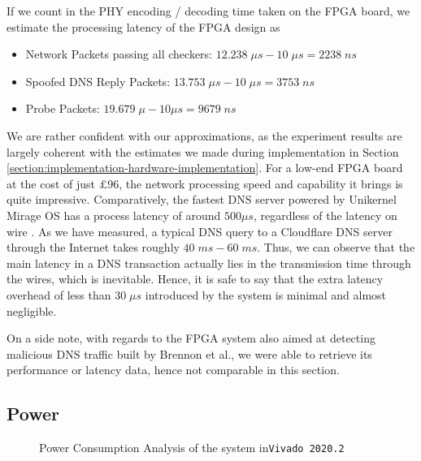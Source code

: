 \documentclass[a4paper]{report}
\newcommand{\code}{\texttt}
\begin{document}
If we count in the PHY encoding / decoding time taken on the FPGA board, we estimate the processing latency of the FPGA design as 
\begin{itemize}[noitemsep]
    \item Network Packets passing all checkers: $12.238\; \mu s - 10\; \mu s= 2238\; ns$
    \item Spoofed DNS Reply Packets: $13.753\; \mu s - 10\; \mu s = 3753\; ns$
    \item Probe Packets: $19.679\; \mu - 10 \mu s = 9679\; ns$
\end{itemize}

We are rather confident with our approximations, as the experiment results are largely coherent with the estimates we made during implementation in Section \ref{section:implementation-hardware-implementation}. For a low-end FPGA board at the cost of just $£96$, the network processing speed and capability it brings is quite impressive. Comparatively, the fastest DNS server powered by Unikernel Mirage OS has a process latency of around $500 \mu s$, regardless of the latency on wire \cite{briggs-2014, madhavapeddy-2013}.  As we have measured, a typical DNS query to a Cloudflare DNS server through the Internet takes roughly $40\;ms - 60\;ms$. Thus, we can observe that the main latency in a DNS transaction actually lies in the transmission time through the wires, which is inevitable. Hence, it is safe to say that the extra latency overhead of less than $30\; \mu s$ introduced by the system is minimal and almost negligible.

On a side note, with regards to the FPGA system also aimed at detecting malicious DNS traffic built by Brennon et al.\cite{thomas-2011}, we were able to retrieve its performance or latency data, hence not comparable in this section.

\subsection{Power}

\begin{figure}[h!]
  \caption{Power Consumption Analysis of the system in\code{Vivado 2020.2}}
  \label{fig:power-consumption-analysis}
\end{figure}
\end{document}
